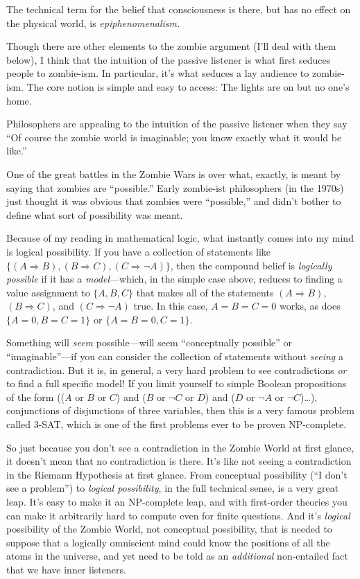 {
 The technical term for the belief that consciousness is there, but
has no effect on the physical world, is \textit{epiphenomenalism.}}

{
 Though there are other elements to the zombie argument
(I'll deal with them below), I think that the intuition
of the passive listener is what first seduces people to zombie-ism. In
particular, it's what seduces a lay audience to
zombie-ism. The core notion is simple and easy to access: The lights
are on but no one's home.}

{
 Philosophers are appealing to the intuition of the passive
listener when they say ``Of course the zombie world is
imaginable; you know exactly what it would be
like.''}

{
 One of the great battles in the Zombie Wars is over what, exactly,
is meant by saying that zombies are
``possible.'' Early zombie-ist
philosophers (in the 1970s) just thought it was obvious that zombies
were ``possible,'' and
didn't bother to define what sort of possibility was
meant.}

{
 Because of my reading in mathematical logic, what instantly comes
into my mind is logical possibility. If you have a collection of
statements like $\{(A \Rightarrow 
B),(B \Rightarrow  C),(C \Rightarrow
\lnot A)\}$, then the compound
belief is \textit{logically possible} if it has a
\textit{model}{}---which, in the simple case above, reduces to finding
a value assignment to
$\{A,B,C\}$
that makes all of the statements $(A \Rightarrow  B)$, $(B \Rightarrow
 C)$, and $(C \Rightarrow \lnot A)$ true. In this case, $A = B = C
= 0$ works, as does $\{A = 0,B = C =
1\}$ or
$\{A = B = 0,C =
1\}$.}

{
 Something will \textit{seem} possible---will seem
``conceptually possible'' or
``imaginable''---if you can consider
the collection of statements without \textit{seeing} a contradiction.
But it is, in general, a very hard problem to see contradictions
\textit{or} to find a full specific model! If you limit yourself to
simple Boolean propositions of the form (($A$ or $B$ or $C$) and ($B$ or
$\lnot C$ or $D$) and ($D$ or $\lnot A$ or $\lnot C$){\dots}),
conjunctions of disjunctions of three variables, then this is a very
famous problem called 3-SAT, which is one of the first problems ever to
be proven NP-complete.}

{
 So just because you don't see a contradiction in
the Zombie World at first glance, it doesn't mean that
no contradiction is there. It's like not seeing a
contradiction in the Riemann Hypothesis at first glance. From
conceptual possibility (``I don't see
a problem'') to \textit{logical possibility}, in the
full technical sense, is a very great leap. It's easy
to make it an NP-complete leap, and with first-order theories you can
make it arbitrarily hard to compute even for finite questions. And
it's \textit{logical} possibility of the Zombie World,
not conceptual possibility, that is needed to suppose that a logically
omniscient mind could know the positions of all the atoms in the
universe, and yet need to be told as an \textit{additional}
non-entailed fact that we have inner listeners.}

